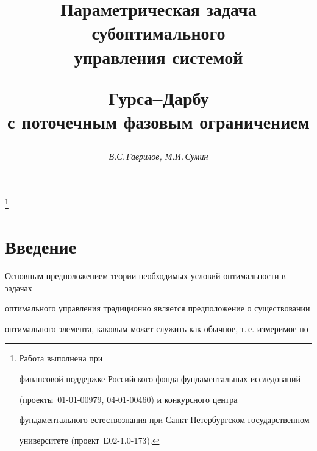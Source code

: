 




\author{\it В.С.\,Гаврилов, М.И.\,Сумин}




\title{Параметрическая задача субоптимального\\ управления системой


Гурса--Дарбу\\


с поточечным фазовым ограничением}


\thanks{Работа выполнена при


финансовой поддержке Российского фонда фундаментальных исследований


(проекты \No\No\,01-01-00979, 04-01-00460) и конкурсного центра 


фундаментального естествознания при Санкт-Петербургском государственном 


университете (проект \No\,Е02-1.0-173).}





\date{}




\pagestyle{plain} %







\maketitle


\label{begin}











\section*{Введение}





Основным предположением теории необходимых условий оптимальности в задачах


оптимального управления традиционно является предположение о существовании


оптимального элемента, каковым может служить как обычное, т.\,е. измеримое по


